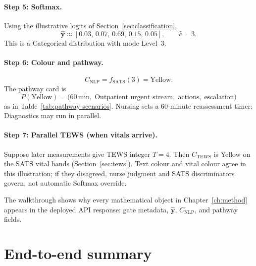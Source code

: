 \paragraph{Step 5: Softmax.}
Using the illustrative logits of Section~\ref{sec:classification},
\[
  \hat{\mathbf{y}}\approx [0.03,\,0.07,\,0.69,\,0.15,\,0.05],\qquad
  \hat{c}=3.
\]
This is a Categorical distribution with mode Level~3.

\paragraph{Step 6: Colour and pathway.}
\[
  C_{\mathrm{NLP}}=f_{\mathrm{SATS}}(3)=\text{Yellow}.
\]
The pathway card is
\[
  P(\text{Yellow})=\bigl(60\,\mathrm{min},\;
  \text{Outpatient urgent stream},\;
  \text{actions},\;
  \text{escalation}\bigr)
\]
as in Table~\ref{tab:pathway-scenarios}. Nursing sets a 60-minute reassessment timer; Diagnostics may run in parallel.

\paragraph{Step 7: Parallel TEWS (when vitals arrive).}
Suppose later measurements give TEWS integer \(T=4\). Then \(C_{\mathrm{TEWS}}\) is Yellow on the SATS vital bands (Section~\ref{sec:tews}). Text colour and vital colour agree in this illustration; if they disagreed, nurse judgment and SATS discriminators govern, not automatic Softmax override.

The walkthrough shows why every mathematical object in Chapter~\ref{ch:method} appears in the deployed API response: gate metadata, \(\hat{\mathbf{y}}\), \(C_{\mathrm{NLP}}\), and pathway fields.

\section{End-to-end summary}
\label{sec:e2e}

